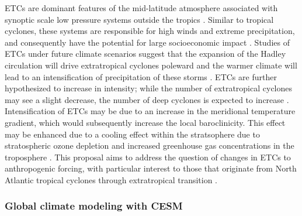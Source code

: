 \documentclass[11pt]{article}
\begin{document}
ETCs are dominant features of the mid-latitude atmosphere associated with synoptic scale low pressure systems outside the tropics \citep{serreze1995climatological}.  Similar to tropical cyclones, these systems are responsible for high winds and extreme precipitation, and consequently have the potential for large socioeconomic impact \citep{ulbrich2009extra}.  Studies of ETCs under future climate scenarios suggest that the expansion of the Hadley circulation will drive extratropical cyclones poleward \citep{bengtsson2006storm} and the warmer climate will lead to an intensification of precipitation of these storms \citep{bengtsson2009will, zappa2013multi}.  ETCs are further hypothesized to increase in intensity; while the number of extratropical cyclones may see a slight decrease, the number of deep cyclones is expected to increase \citep{ulbrich2009extra}. Intensification of ETCs may be due to an increase in the meridional temperature gradient, which would subsequently increase the local baroclinicity. This effect may be enhanced due to a cooling effect within the stratsophere due to stratospheric ozone depletion and increased greenhouse gas concentrations in the troposphere \citep{vose2014monitoring}.  This proposal aims to address the question of changes in ETCs to anthropogenic forcing, with particular interest to those that originate from North Atlantic tropical cyclones through extratropical transition \citep{hart2001climatology}.  


\subsubsection{Global climate modeling with CESM} \label{sec:cesm-description}
\end{document}
